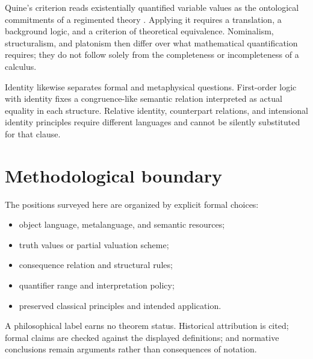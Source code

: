 Quine's criterion reads existentially quantified variable values as the
ontological commitments of a regimented theory \cite{Quine1948}. Applying it
requires a translation, a background logic, and a criterion of theoretical
equivalence. Nominalism, structuralism, and platonism then differ over what
mathematical quantification requires; they do not follow solely from the
completeness or incompleteness of a calculus.

Identity likewise separates formal and metaphysical questions. First-order
logic with identity fixes a congruence-like semantic relation interpreted as
actual equality in each structure. Relative identity, counterpart relations,
and intensional identity principles require different languages and cannot be
silently substituted for that clause.

\section{Methodological boundary}
\label{sec:p11-method-boundary}

The positions surveyed here are organized by explicit formal choices:

\begin{itemize}
  \item object language, metalanguage, and semantic resources;
  \item truth values or partial valuation scheme;
  \item consequence relation and structural rules;
  \item quantifier range and interpretation policy;
  \item preserved classical principles and intended application.
\end{itemize}

A philosophical label earns no theorem status. Historical attribution is
cited; formal claims are checked against the displayed definitions; and
normative conclusions remain arguments rather than consequences of notation.
